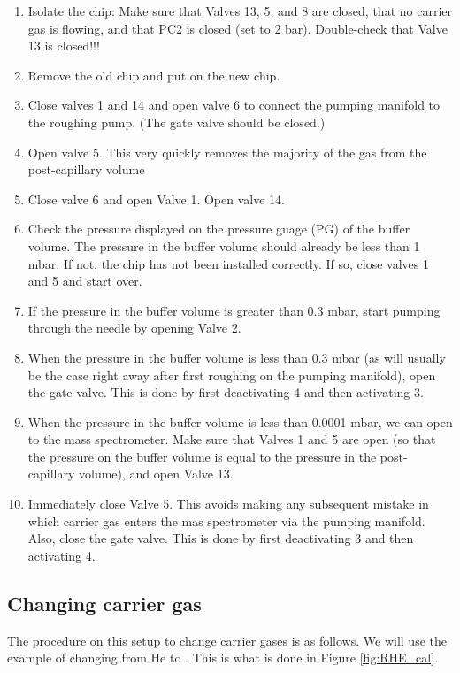 \begin{enumerate}
	\item Isolate the chip: Make sure that Valves 13, 5, and 8 are closed, that no carrier gas is flowing, and that PC2 is closed (set to 2 bar). Double-check that Valve 13 is closed!!!
	
	\item Remove the old chip and put on the new chip.
	
	\item Close valves 1 and 14 and open valve 6 to connect the pumping manifold to the roughing pump. (The gate valve should be closed.)
	
	\item Open valve 5. This very quickly removes the majority of the gas from the post-capillary volume
	
	\item Close valve 6 and open Valve 1. Open valve 14.  
	
	\item Check the pressure displayed on the pressure guage (PG) of the buffer volume. The pressure in the buffer volume should already be less than 1 mbar. If not, the chip has not been installed correctly. If so, close valves 1 and 5 and start over.
	
	\item If the pressure in the buffer volume is greater than 0.3 mbar, start pumping through the needle by opening Valve 2.
	
	\item When the pressure in the buffer volume is less than 0.3 mbar (as will usually be the case right away after first roughing on the pumping manifold), open the gate valve. This is done by first deactivating 4 and then activating 3.
	
	\item When the pressure in the buffer volume is less than 0.0001 mbar, we can open to the mass spectrometer. Make sure that Valves 1 and 5 are open (so that the pressure on the buffer volume is equal to the pressure in the post-capillary volume), and open Valve 13.
	
	\item Immediately close Valve 5. This avoids making any subsequent mistake in which carrier gas enters the mas spectrometer via the pumping manifold. Also, close the gate valve. This is done by first deactivating 3 and then activating 4.
\end{enumerate}


\subsection{Changing carrier gas}
The procedure on this setup to change carrier gases is as follows. We will use the example of changing from He to . This is what is done in Figure \ref{fig:RHE_cal}.


